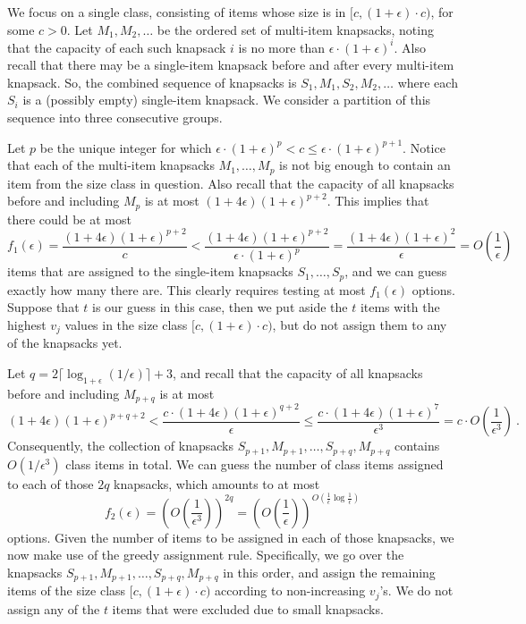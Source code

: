 \documentclass[11pt]{article}
\theoremstyle{plain}
\theoremstyle{definition}
\begin{document}
We focus on a single class, consisting of items whose size is in $[c,(1+\epsilon) \cdot c)$, for some $c > 0$. Let $M_1, M_2, \ldots$ be the ordered set of multi-item knapsacks, noting that the capacity of each such knapsack $i$ is no more than $\epsilon \cdot (1+\epsilon)^{i}$. Also recall that there may be a single-item knapsack before and after every multi-item knapsack. So, the combined sequence of knapsacks is $S_1, M_1, S_2, M_2, \ldots$ where each $S_i$ is a (possibly empty) single-item knapsack. We consider a partition of this sequence into three consecutive groups.

\smallskip {}
Let $p$ be the unique integer for which $\epsilon \cdot (1+\epsilon)^{p} < c \leq \epsilon \cdot (1+\epsilon)^{p+1}$. Notice that each of the multi-item knapsacks $M_1, \ldots, M_p$ is not big enough to contain an item from the size class in question. Also recall that the capacity of all knapsacks before and including $M_p$ is at most $(1 + 4 \epsilon)(1+\epsilon)^{p+2}$. This implies that there could be at most
$$
f_1(\epsilon) = \frac{(1+ 4 \epsilon)(1+\epsilon)^{p+2}}{c} < \frac{(1+ 4 \epsilon)(1+\epsilon)^{p+2}}{\epsilon \cdot (1+\epsilon)^{p}} = \frac{(1+ 4 \epsilon)(1+\epsilon)^2}{\epsilon} = O\left(\frac{ 1 }{ \epsilon }\right)
$$
items that are assigned to the single-item knapsacks $S_1, \ldots, S_p$, and we can guess exactly how many there are. This clearly requires testing at most $f_1(\epsilon)$ options. Suppose that $t$ is our guess in this case, then we put aside the $t$ items with the highest $v_j$ values in the size class $[c,(1+\epsilon) \cdot c)$, but do not assign them to any of the knapsacks yet.

\smallskip {}
Let $q = 2\lceil\log_{1+\epsilon}(1/ \epsilon)\rceil + 3$, and recall that the capacity of all knapsacks before and including $M_{p+q}$ is at most
$$
(1 + 4 \epsilon)(1+\epsilon)^{p+q+2} < \frac{c \cdot (1 + 4 \epsilon) (1+\epsilon)^{q+2}}{\epsilon} \leq \frac{c \cdot (1 + 4 \epsilon) (1+\epsilon)^7}{\epsilon^{3}} = c \cdot O\left(\frac{ 1 }{ \epsilon^3 }\right) \ .
$$
Consequently, the collection of knapsacks $S_{p+1}, M_{p+1}, \ldots, S_{p+q}, M_{p+q}$ contains $O( 1 / \epsilon^3 )$ class items in total. We can guess the number of class items assigned to each of those $2q$ knapsacks, which amounts to at most
$$
f_2(\epsilon) = \left(O\left(\frac{ 1 }{ \epsilon^3 }\right) \right)^{2q} = \left(O \left( \frac{ 1 }{ \epsilon } \right) \right)^{ O( \frac{ 1 }{ \epsilon } \log \frac{ 1 }{ \epsilon } ) }
$$
options. Given the number of items to be assigned in each of those knapsacks, we now make use of the greedy assignment rule. Specifically, we go over the knapsacks $S_{p+1}, M_{p+1}, \ldots, S_{p+q}, M_{p+q}$ in this order, and assign the remaining items of the size class $[c,(1+\epsilon) \cdot c)$ according to non-increasing $v_j$'s. We do not assign any of the $t$ items that were excluded due to small knapsacks.
\end{document}
